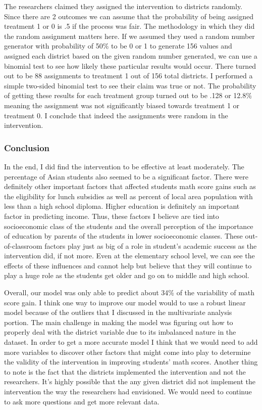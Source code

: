 \documentclass[11pt]{article}
\begin{document}
    The researchers claimed they assigned the intervention to districts
randomly. Since there are 2 outcomes we can assume that the probability
of being assigned treatment 1 or 0 is .5 if the process was fair. The
methodology in which they did the random assignment matters here. If we
assumed they used a random number generator with probability of 50\% to
be 0 or 1 to generate 156 values and assigned each district based on the
given random number generated, we can use a binomial test to see how
likely these particular results would occur. There turned out to be 88
assignments to treatment 1 out of 156 total districts. I performed a
simple two-sided binomial test to see their claim was true or not. The
probability of getting these results for each treatment group turned out
to be .128 or 12.8\% meaning the assignment was not significantly biased
towards treatment 1 or treatment 0. I conclude that indeed the
assignments were random in the intervention.

    \subsubsection{Conclusion}\label{conclusion}

In the end, I did find the intervention to be effective at least
moderately. The percentage of Asian students also seemed to be a
significant factor. There were definitely other important factors that
affected students math score gains such as the eligibility for lunch
subsidies as well as percent of local area population with less than a
high school diploma. Higher education is definitely an important factor
in predicting income. Thus, these factors I believe are tied into
socioeconomic class of the students and the overall perception of the
importance of education by parents of the students in lower
socioeconomic classes. These out-of-classroom factors play just as big
of a role in student's academic success as the intervention did, if not
more. Even at the elementary school level, we can see the effects of
these influences and cannot help but believe that they will continue to
play a huge role as the students get older and go on to middle and high
school.

Overall, our model was only able to predict about 34\% of the
variability of math score gain. I think one way to improve our model
would to use a robust linear model because of the outliers that I
discussed in the multivariate analysis portion. The main challenge in
making the model was figuring out how to properly deal with the district
variable due to its imbalanced nature in the dataset. In order to get a
more accurate model I think that we would need to add more variables to
discover other factors that might come into play to determine the
validity of the intervention in improving students' math scores. Another
thing to note is the fact that the districts implemented the
intervention and not the researchers. It's highly possible that the any
given district did not implement the intervention the way the
researchers had envisioned. We would need to continue to ask more
questions and get more relevant data.


    
    
    
    
\end{document}
